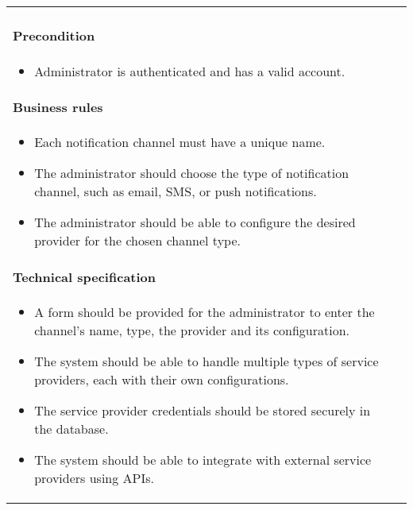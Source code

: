 \begin{longtable}{ | m{} | m{} | }
    \paragraph*{Precondition} \mbox{} \newline
    \begin{itemize}
        \item Administrator is authenticated and has a valid account.
    \end{itemize}
    \paragraph*{Business rules} \mbox{} \newline
    \begin{itemize}
        \item Each notification channel must have a unique name.
        \item The administrator should choose the type of notification channel, such as email, SMS, or push notifications.
        \item The administrator should be able to configure the desired provider for the chosen channel type.
    \end{itemize}
    \paragraph*{Technical specification} \mbox{} \newline
    \begin{itemize}
        \item A form should be provided for the administrator to enter the channel's name, type, the provider and its configuration.
        \item The system should be able to handle multiple types of service providers, each with their own configurations.
        \item The service provider credentials should be stored securely in the database.
        \item The system should be able to integrate with external service providers using APIs.
    \end{itemize}

\end{longtable}
